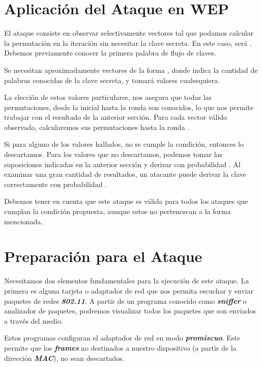 \documentclass[
]{article}
\begin{document}
\hypertarget{aplicaciuxf3n-del-ataque-en-wep}{%
\section{Aplicación del Ataque en
WEP}\label{aplicaciuxf3n-del-ataque-en-wep}}

El ataque consiste en observar selectivamente vectores {} tal que
podamos calcular la permutación en la iteración {} sin necesitar la
clave secreta. En este caso, {} será {}. Debemos previamente conocer la
primera palabra de flujo de claves.

Se necesitan aproximadamente {} vectores de la forma {}, donde {} indica
la cantidad de palabras conocidas de la clave secreta, y {} tomará
valores cualesquiera.

La elección de estos valores particulares, nos asegura que todas las
permutaciones, desde la inicial hasta la ronda {} son conocidos, lo que
nos permite trabajar con el resultado de la anterior sección. Para cada
vector válido observado, calcularemos sus permutaciones hasta la ronda
{}.

Si para alguno de los valores hallados, no se cumple la condición,
entonces lo descartamos. Para los valores que no descartamos, podemos
tomar las suposiciones indicadas en la anterior sección y derivar {} con
probabilidad {}. Al examinar una gran cantidad de resultados, un
atacante puede derivar la clave correctamente con probabilidad {}.

Debemos tener en cuenta que este ataque es válida para todos los ataques
que cumplan la condición propuesta, aunque estos no pertenezcan a la
forma mencionada.

\hypertarget{preparaciuxf3n-para-el-ataque}{%
\section{Preparación para el
Ataque}\label{preparaciuxf3n-para-el-ataque}}

Necesitamos dos elementos fundamentales para la ejecución de este
ataque. La primera es alguna tarjeta o adaptador de red que nos permita
escuchar y enviar paquetes de redes \textbf{\emph{802.11}}. A partir de
un programa conocido como \textbf{\emph{sniffer}} o analizador de
paquetes, podremos visualizar todos los paquetes que son enviados a
través del medio.

Estos programas configuran el adaptador de red en modo
\textbf{\emph{promiscuo}}. Este permite que los \textbf{\emph{frames}}
no destinados a nuestro dispositivo (a partir de la dirección
\textbf{\emph{MAC}}), no sean descartados.
\end{document}
